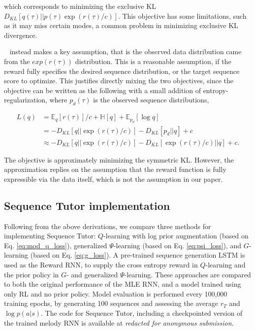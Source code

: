 which corresponds to minimizing the exclusive KL $D_{KL}[q(\tau)||p(\tau)\exp(r(\tau)/c)]$. This objective has some limitations, such as it may miss certain modes, a common problem in minimizing exclusive KL divergence.  

~\citet{norouzi2016reward} instead makes a key assumption, that is the observed data distribution came from the $exp(r(\tau))$ distribution. This is a reasonable assumption, if the reward fully specifies the desired sequence distribution, or the target sequence score to optimize. This justifies directly mixing the two objectives, since the objective can be written as the following with a small addition of entropy-regularization, where $p_d(\tau)$ is the observed sequence distributions,

\begin{equation}
\begin{split}
\label{eq:rwml_rl}
L(q) &= \mathbb{E}_{q}[r(\tau)]/c + \mathbb{H}[q]+\mathbb{E}_{p_d}[\log q]  \\
&= -D_{KL}[q||\exp(r(\tau)/c)] - D_{KL}[p_d||q] +c \\
&\approx -D_{KL}[q||\exp(r(\tau)/c)] - D_{KL}[\exp(r(\tau)/c)||q] + c.
\end{split}
\end{equation}

The objective is approximately minimizing the symmetric KL. However, the approximation replies on the assumption that the reward function is fully expressible via the data itself, which is not the assumption in our paper. 

\fi

\subsection{Sequence Tutor implementation} Following from the above derivations, we compare three methods for implementing Sequence Tutor: $Q$-learning with log prior augmentation (based on Eq. \ref{eq:mod_q_loss}), generalized $\Psi$-learning (based on Eq. \ref{eq:psi_loss}), and $G$-learning (based on Eq. \ref{eq:g_loss}). A pre-trained sequence generation LSTM is used as the Reward RNN, to supply the cross entropy reward in $Q$-learning and the prior policy in $G$- and generalized $\Psi$-learning. These approaches are compared to both the original performance of the MLE RNN, and a model trained using only RL and no prior policy. Model evaluation is performed every 100,000 training epochs, by generating 100 sequences and assessing the average $r_{T}$ and $\log p(a|s)$. The code for Sequence Tutor, including a checkpointed version of the trained melody RNN is available at \emph{redacted for anonymous submission}. 

